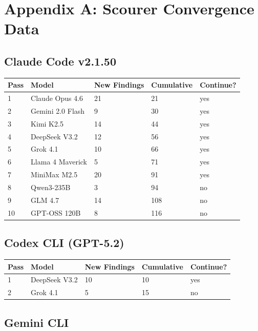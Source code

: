 \section{Appendix A: Scourer Convergence Data}

\subsection{Claude Code v2.1.50}

\begin{table}[t]
\small
\begin{tabular}{@{}lllll@{}}
\toprule
Pass & Model & New Findings & Cumulative & Continue? \\
\midrule
1 & Claude Opus 4.6 & 21 & 21 & yes \\
2 & Gemini 2.0 Flash & 9 & 30 & yes \\
3 & Kimi K2.5 & 14 & 44 & yes \\
4 & DeepSeek V3.2 & 12 & 56 & yes \\
5 & Grok 4.1 & 10 & 66 & yes \\
6 & Llama 4 Maverick & 5 & 71 & yes \\
7 & MiniMax M2.5 & 20 & 91 & yes \\
8 & Qwen3-235B & 3 & 94 & no \\
9 & GLM 4.7 & 14 & 108 & no \\
10 & GPT-OSS 120B & 8 & 116 & no \\
\bottomrule
\end{tabular}
\end{table}

\subsection{Codex CLI (GPT-5.2)}

\begin{table}[t]
\small
\begin{tabular}{@{}lllll@{}}
\toprule
Pass & Model & New Findings & Cumulative & Continue? \\
\midrule
1 & DeepSeek V3.2 & 10 & 10 & yes \\
2 & Grok 4.1 & 5 & 15 & no \\
\bottomrule
\end{tabular}
\end{table}

\subsection{Gemini CLI}

